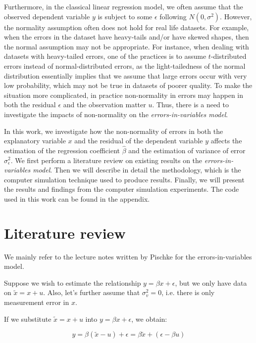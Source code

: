 \documentclass{article}
\begin{document}
Furthermore, in the classical linear regression model, we often assume that the observed dependent variable $y$ is subject to some $\epsilon$ following $N(0, \sigma^2)$.
However, the normality assumption often does not hold for real life datasets.
For example, when the errors in the dataset have heavy-tails and/or have skewed shapes, then the normal assumption may not be appropriate.
For instance, when dealing with datasets with heavy-tailed errors, one of the practices is to assume $t$-distributed errors instead of normal-distributed errors,
as the light-tailedness of the normal distribution essentially implies that we assume that large errors occur with very low probability, which may not be true in datasets of poorer quality.
To make the situation more complicated, in practice non-normality in errors may happen in both the residual $\epsilon$ and the observation matter $u$.
Thus, there is a need to investigate the impacts of non-normality on the \textit{errors-in-variables model}. 

In this work, we investigate how the non-normality of errors in both the explanatory variable $x$ and the residual of the dependent variable $y$ affects the estimation of the regression coefficient $\hat{\beta}$ and the estimation of variance of error $\sigma^2_\epsilon$.
We first perform a literature review on existing results on the \textit{errors-in-variables model}.
Then we will describe in detail the methodology, which is the computer simulation technique used to produce results.
Finally, we will present the results and findings from the computer simulation experiments.
The code used in this work can be found in the appendix.

\section{Literature review}

We mainly refer to the lecture notes written by Pischke \cite{lecturenotes} for the errors-in-variables model. 

Suppose we wish to estimate the relationship $y = \beta x + \epsilon$, but we only have data on $\tilde{x} = x + u$. Also, let's further assume that $\sigma_v^2 = 0$, i.e. there is only measurement error in $x$.

If we substitute $\tilde{x} = x+u$ into $y = \beta x + \epsilon$, we obtain:

\begin{equation}
    y = \beta(\tilde{x} - u) + \epsilon = \beta \tilde{x} + (\epsilon - \beta u)
\end{equation}
\end{document}
